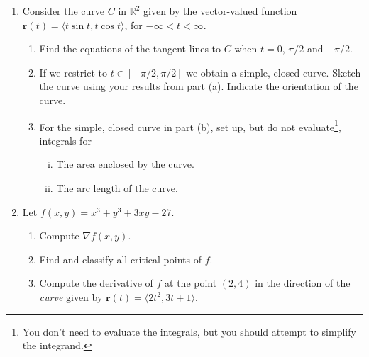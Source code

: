 \documentclass[12pt]{article}
\newcommand{\points}[1]{\marginpar{\hspace{24pt}[#1]}}
\newcommand{\R}{\mathbb{R}}
\renewcommand{\r}{\mathbf{r}}
\begin{document}
\begin{enumerate}
\item Consider the curve $C$ in $\R^2$ given by the vector-valued function $\r(t)=\langle t\sin t,t\cos t\rangle$, for $-\infty<t<\infty$.
\begin{enumerate}
\item Find the equations of the tangent lines to $C$ when $t=0,\, \pi/2$ and $-\pi/2$.  \points{5}

\vspace{4in}

\item If we restrict to $t\in [-\pi/2,\pi/2]$ we obtain a simple, closed curve. Sketch the curve using your results from part (a). Indicate the orientation of the curve.  \points{3} 

\newpage

\item For the simple, closed curve in part (b), set up, but do not evaluate\footnote{You don't need to evaluate the integrals, but you should attempt to simplify the integrand.}, integrals for
\begin{enumerate}[(i)]
\item The area enclosed by the curve. \points{3}

\vspace{3in}

\item The arc length of the curve. \points{3}

\end{enumerate}

\end{enumerate}
\newpage

\item Let $f(x,y) = x^3+y^3+3xy-27$.
\begin{enumerate}
\item Compute $\nabla f(x,y)$. \points{2}

\vspace{1in}

\item Find and classify all critical points of $f$. \points{6}

\vspace{4in}

\item Compute the derivative of $f$ at the point $(2,4)$ in the direction of the {\em curve} given by $\r(t) = \langle 2t^2, 3t+1\rangle$. \points{4}


\end{enumerate}
\end{enumerate}
\end{document}
